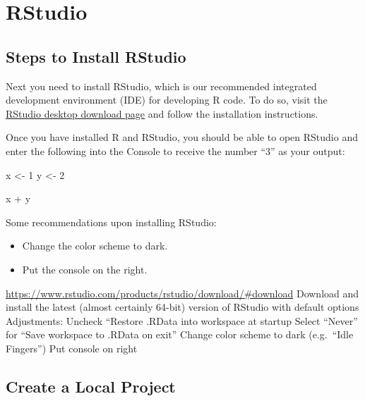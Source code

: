\documentclass[
]{book}
\newenvironment{Shaded}{\begin{snugshade}}{\end{snugshade}}
\newcommand{\DecValTok}[1]{\textcolor[rgb]{0.00,0.00,0.81}{#1}}
\newcommand{\NormalTok}[1]{#1}
\newcommand{\OtherTok}[1]{\textcolor[rgb]{0.56,0.35,0.01}{#1}}
\newcommand{\SpecialCharTok}[1]{\textcolor[rgb]{0.00,0.00,0.00}{#1}}
\providecommand{\tightlist}{%
  \setlength{\itemsep}{0pt}\setlength{\parskip}{0pt}}
\begin{document}
\hypertarget{rstudio}{%
\section{RStudio}\label{rstudio}}

\hypertarget{steps-to-install-rstudio}{%
\subsection{Steps to Install RStudio}\label{steps-to-install-rstudio}}

Next you need to install RStudio, which is our recommended integrated development environment (IDE) for developing R code. To do so, visit the \href{https://rstudio.com/products/rstudio/download/}{RStudio desktop download page} and follow the installation instructions.

Once you have installed R and RStudio, you should be able to open RStudio and enter the following into the Console to receive the number ``3'' as your output:

\begin{Shaded}
\begin{Highlighting}[]
\NormalTok{x }\OtherTok{\textless{}{-}} \DecValTok{1}
\NormalTok{y }\OtherTok{\textless{}{-}} \DecValTok{2}

\NormalTok{x }\SpecialCharTok{+}\NormalTok{ y}
\end{Highlighting}
\end{Shaded}

Some recommendations upon installing RStudio:

\begin{itemize}
\tightlist
\item
  Change the color scheme to dark.
\item
  Put the console on the right.
\end{itemize}

\url{https://www.rstudio.com/products/rstudio/download/\#download}
Download and install the latest (almost certainly 64-bit) version of RStudio with default options
Adjustments:
Uncheck ``Restore .RData into workspace at startup
Select ``Never'' for ``Save workspace to .RData on exit''
Change color scheme to dark (e.g.~``Idle Fingers'')
Put console on right

\hypertarget{create-a-local-project}{%
\subsection{Create a Local Project}\label{create-a-local-project}}
\end{document}
